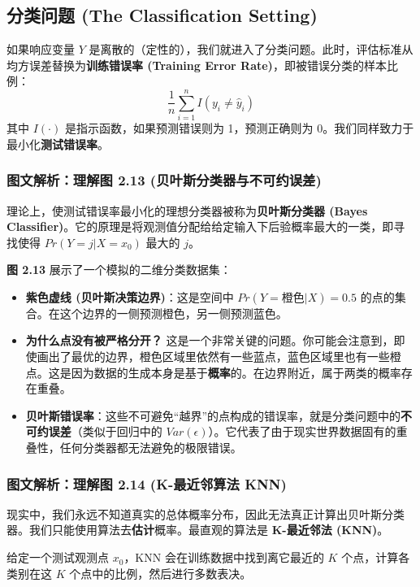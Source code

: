 \documentclass[UTF8]{ctexart}
\numberwithin{equation}{section}
\begin{document}
\subsection{分类问题 (The Classification Setting)}

如果响应变量 $Y$ 是离散的（定性的），我们就进入了分类问题。此时，评估标准从均方误差替换为\textbf{训练错误率 (Training Error Rate)}，即被错误分类的样本比例：
\begin{equation}
\frac{1}{n} \sum_{i=1}^n I(y_i \neq \hat{y}_i)
\end{equation}
其中 $I(\cdot)$ 是指示函数，如果预测错误则为 1，预测正确则为 0。我们同样致力于最小化\textbf{测试错误率}。

\subsubsection{图文解析：理解图 2.13 (贝叶斯分类器与不可约误差)}

理论上，使测试错误率最小化的理想分类器被称为\textbf{贝叶斯分类器 (Bayes Classifier)}。它的原理是将观测值分配给给定输入下后验概率最大的一类，即寻找使得 $Pr(Y=j | X=x_0)$ 最大的 $j$。

\textbf{图 2.13} 展示了一个模拟的二维分类数据集：
\begin{itemize}
    \item \textbf{紫色虚线 (贝叶斯决策边界)}：这是空间中 $Pr(Y=\text{橙色} | X) = 0.5$ 的点的集合。在这个边界的一侧预测橙色，另一侧预测蓝色。
    \item \textbf{为什么点没有被严格分开？} 这是一个非常关键的问题。你可能会注意到，即使画出了最优的边界，橙色区域里依然有一些蓝点，蓝色区域里也有一些橙点。这是因为数据的生成本身是基于\textbf{概率}的。在边界附近，属于两类的概率存在重叠。
    \item \textbf{贝叶斯错误率}：这些不可避免“越界”的点构成的错误率，就是分类问题中的\textbf{不可约误差}（类似于回归中的 $Var(\epsilon)$）。它代表了由于现实世界数据固有的重叠性，任何分类器都无法避免的极限错误。
\end{itemize}

\subsubsection{图文解析：理解图 2.14 (K-最近邻算法 KNN)}

现实中，我们永远不知道真实的总体概率分布，因此无法真正计算出贝叶斯分类器。我们只能使用算法去\textbf{估计}概率。最直观的算法是 \textbf{K-最近邻法 (KNN)}。

给定一个测试观测点 $x_0$，KNN 会在训练数据中找到离它最近的 $K$ 个点，计算各类别在这 $K$ 个点中的比例，然后进行多数表决。
\end{document}
